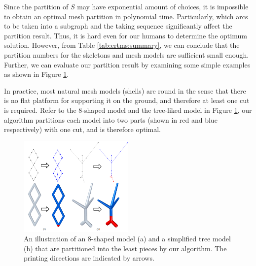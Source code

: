 Since the partition of $S$ may have exponential amount of choices, it is impossible to obtain an optimal mesh partition in polynomial time. Particularly, which arcs to be taken into a subgraph and the taking sequence significantly affect the partition result. Thus, it is hard even for our humans to determine the optimum solution. However, from Table \ref{tab:ertms:summary}, we can conclude that the partition numbers for the skeletons and mesh models are sufficient small enough. Further, we can evaluate our partition result by examining some simple examples as shown in Figure \ref{fig:simpletree}. 

In practice, most natural mesh models (shells) are round in the sense that there is no flat platform for supporting it on the ground, and therefore at least one cut is required. Refer to the 8-shaped model and the tree-liked model in Figure \ref{fig:simpletree}, our algorithm partitions each model into two parts (shown in red and blue respectively) with one cut, and is therefore optimal.

\begin{figure}[tbp]
  \centering
  \includegraphics[width=0.5\textwidth]{figs/simpletree.png}
  \caption{\label{fig:simpletree}%
           An illustration of an 8-shaped model (a) and a simplified tree model (b) that are partitioned into the least pieces by our algorithm. The printing directions are indicated by arrows.}
\end{figure}



